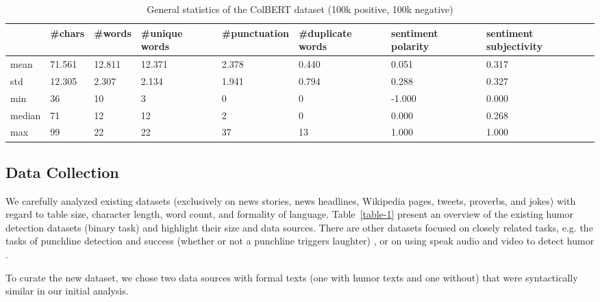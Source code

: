 \documentclass{article}
\begin{document}
\begin{table*}[t]
  \caption{General statistics of the ColBERT dataset (100k positive, 100k negative)}
  \label{table-2}
  \centering
  \begin{tabular}{p{1.1cm}|p{0.9cm}p{0.95cm}p{1.2cm}p{2.1cm}p{1.8cm}p{1.6cm}p{2.2cm}}
\hline & \#chars & \#words & \#unique words & \#punctuation & \#duplicate words & sentiment polarity & sentiment subjectivity \\ \hline
mean & 71.561  & 12.811  & 12.371         & 2.378          & 0.440    & 0.051              & 0.317                  \\
std  & 12.305  & 2.307   & 2.134          & 1.941          & 0.794     & 0.288              & 0.327                  \\
min  & 36      & 10      & 3              & 0              & 0       & -1.000             & 0.000                  \\
median & 71      & 12      & 12             & 2              & 0       & 0.000              & 0.268                  \\
max  & 99      & 22      & 22             & 37             & 13       & 1.000              & 1.000     \\ \hline
  \end{tabular}
\end{table*}

\subsection{Data Collection}
\label{sec:datacol}

We carefully analyzed existing datasets (exclusively on news stories, news headlines, Wikipedia pages, tweets, proverbs, and jokes) with regard to table size, character length, word count, and formality of language. Table~\ref{table-1} present an overview of the existing humor detection datasets (binary task) and highlight their size and data sources. There are other datasets focused on closely related tasks, e.g. the tasks of punchline detection and success (whether or not a punchline triggers laughter) \cite{chen2017predicting,hasan2019ur}, or on using speak audio and video to detect humor \cite{bertero2016deep,hasan2019ur}. 

To curate the new dataset, we chose two data sources with formal texts (one with humor texts and one without) that were syntactically similar in our initial analysis.
\end{document}
